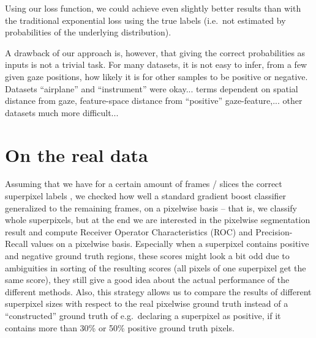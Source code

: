 Using our loss function, we could achieve even slightly better results than with the traditional exponential loss using the true labels (i.e.\ not estimated by probabilities of the underlying distribution).

A drawback of our approach is, however, that giving the correct probabilities as inputs is not a trivial task. For many datasets, it is not easy to infer, from a few given gaze positions, how likely it is for other samples to be positive or negative. Datasets ``airplane'' and ``instrument'' were okay... terms dependent on spatial distance from gaze, feature-space distance from ``positive'' gaze-feature,... other datasets much more difficult...

\section{On the real data}
Assuming that we have for a certain amount of frames / slices the correct superpixel labels
, we checked how well a standard gradient boost classifier generalized to the remaining frames, on a pixelwise basis -- that is, we classify whole superpixels, but at the end we are interested in the pixelwise segmentation result and compute Receiver Operator Characteristics (ROC) and Precision-Recall values on a pixelwise basis. 
Especially when a superpixel contains positive and negative ground truth regions, these scores might look a bit odd due to ambiguities in sorting of the resulting scores (all pixels of one superpixel get the same score), they still give a good idea about the actual performance of the different methods. Also, this strategy allows us to compare the results of different superpixel sizes with respect to the real pixelwise ground truth instead of a ``constructed'' ground truth of e.g.\ declaring a superpixel as positive, if it contains more than 30\% or 50\% positive ground truth pixels.


